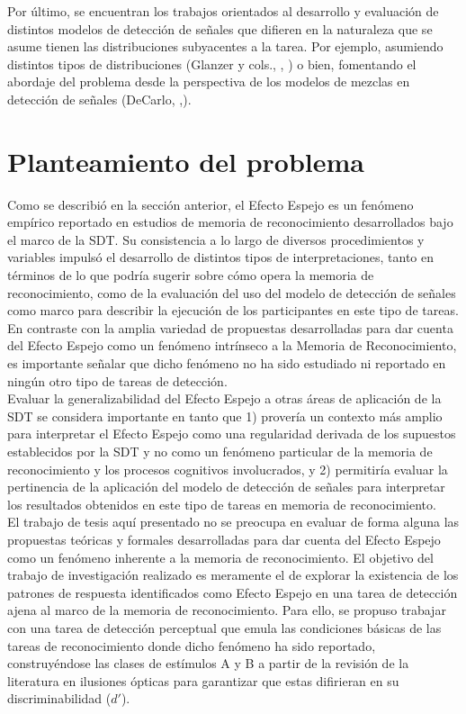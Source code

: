 Por último, se encuentran los trabajos orientados al desarrollo y evaluación de distintos modelos de detección de señales que difieren en la naturaleza que se asume tienen las distribuciones subyacentes a la tarea. Por ejemplo, asumiendo distintos tipos de distribuciones (Glanzer y cols., \citeyear{Glanzer1993}, \citeyear{Glanzer2009}) o bien, fomentando el abordaje del problema desde la perspectiva de los modelos de mezclas en detección de señales (DeCarlo, \citeyear{DeCarlo2002} ,\citeyear{DeCarlo2007}).\\

\section{Planteamiento del problema}

Como se describió en la sección anterior, el Efecto Espejo es un fenómeno empírico reportado en estudios de memoria de reconocimiento desarrollados bajo el marco de la SDT. Su consistencia a lo largo de diversos procedimientos y variables impulsó el desarrollo de distintos tipos de interpretaciones, tanto en términos de lo que podría sugerir sobre cómo opera la memoria de reconocimiento, como de la evaluación del uso del modelo de detección de señales como marco para describir la ejecución de los participantes en este tipo de tareas.\\

En contraste con la amplia variedad de propuestas desarrolladas para dar cuenta del Efecto Espejo como un fenómeno intrínseco a la Memoria de Reconocimiento, es importante señalar que dicho fenómeno no ha sido estudiado ni reportado en ningún otro tipo de tareas de detección.\\

Evaluar la generalizabilidad del Efecto Espejo a otras áreas de aplicación de la SDT se considera importante en tanto que 1) provería un contexto más amplio para interpretar el Efecto Espejo como una regularidad derivada de los supuestos establecidos por la SDT y no como un fenómeno particular de la memoria de reconocimiento y los procesos cognitivos involucrados, y 2) permitiría evaluar la pertinencia de la aplicación del modelo de detección de señales para interpretar los resultados obtenidos en este tipo de tareas en memoria de reconocimiento.\\

El trabajo de tesis aquí presentado no se preocupa en evaluar de forma alguna las propuestas teóricas y formales desarrolladas para dar cuenta del Efecto Espejo como un fenómeno inherente a la memoria de reconocimiento. El objetivo del trabajo de investigación realizado es meramente el de explorar la existencia de los patrones de respuesta identificados como Efecto Espejo en una tarea de detección ajena al marco de la memoria de reconocimiento. Para ello, se propuso trabajar con una tarea de detección perceptual que emula las condiciones básicas de las tareas de reconocimiento donde dicho fenómeno ha sido reportado, construyéndose las clases de estímulos A y B a partir de la revisión de la literatura en ilusiones ópticas para garantizar que estas difirieran en su discriminabilidad ($d'$).\\

